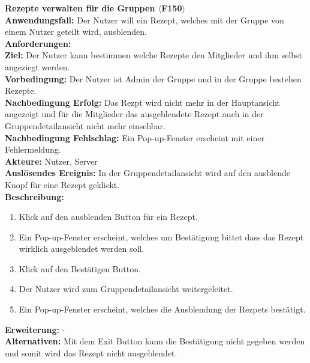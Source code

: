 \documentclass[parskip=full]{scrartcl}
\begin{document}
\textbf{Rezepte verwalten für die Gruppen $\langle$F150$\rangle$}\\
\textbf{Anwendungsfall:} Der Nutzer will ein Rezept, welches mit der Gruppe von einem Nutzer geteilt wird, ausblenden.\\
\textbf{Anforderungen:} \\
\textbf{Ziel:} Der Nutzer kann bestimmen welche Rezepte den Mitglieder und ihm selbst angeziegt werden.\\
\textbf{Vorbedingung:} Der Nutzer ist Admin der Gruppe und in der Gruppe bestehen Rezepte.\\
\textbf{Nachbedingung Erfolg:} Das Rezpt wird nicht mehr in der Hauptansicht angezeigt und für die Mitglieder das ausgeblendete Rezept auch in der Gruppendetailansicht nicht mehr einsehbar.\\
\textbf{Nachbedingung Fehlschlag:} Ein Pop-up-Fenster erscheint mit einer Fehlermeldung.\\
\textbf{Akteure:} Nutzer, Server \\
\textbf{Auslösendes Ereignis:} In der Gruppendetailansicht wird auf den ausblende Knopf für eine Rezept geklickt.\\
\textbf{Beschreibung:}
\begin{enumerate}
    \item Klick auf den ausblenden Button für ein Rezept.
    \item Ein Pop-up-Fenster erscheint, welches um Bestätigung bittet dass das Rezept wirklich ausgeblendet werden soll.
    \item Klick auf den Bestätigen Button.
    \item Der Nutzer wird zum Gruppendetailansicht weitergeleitet.
    \item Ein Pop-up-Fenster erscheint, welches die Ausblendung der Rezpets bestätigt.
\end{enumerate}
\textbf{Erweiterung:} -\\
\textbf{Alternativen:} Mit dem Exit Button kann die Bestätigung nicht gegeben werden und somit wird das Rezept nicht ausgeblendet.\\
\newpage
\end{document}
